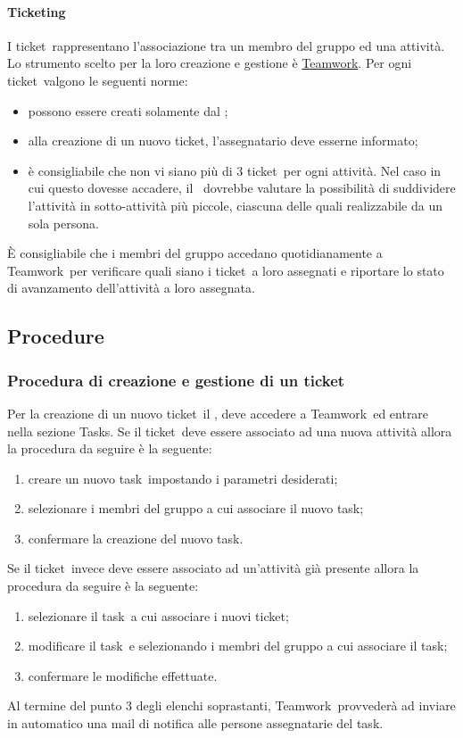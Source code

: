 \documentclass[../NormeProgetto.tex]{subfiles}
\begin{document}
			\paragraph{Ticketing}
			I ticket\g\ rappresentano l'associazione tra un membro del gruppo ed una attività. Lo strumento scelto per la loro creazione e gestione è \hyperref[sec: Pianificazione Teamwork]{Teamwork}. Per ogni ticket\g\ 
valgono le seguenti norme:
			\begin{itemize}
				\item possono essere creati solamente dal \responsabilediprogetto;
				\item alla creazione di un nuovo ticket\g, l'assegnatario deve esserne informato;
				\item è consigliabile che non vi siano più di 3 ticket\g\ per ogni attività. Nel caso in cui questo dovesse accadere, il \responsabilediprogetto\ dovrebbe valutare la possibilità di suddividere l'attività in sotto-attività più piccole, ciascuna delle quali realizzabile da un sola persona.
			\end{itemize}			 
			 È consigliabile che i membri del gruppo accedano quotidianamente a Teamwork\g\ per verificare quali siano i ticket\g\ a loro assegnati e riportare lo stato di avanzamento dell'attività a loro assegnata.
	\subsection{Procedure}
			\subsubsection{Procedura di creazione e gestione di un ticket}				 		Per la creazione di un nuovo ticket\g\ il \responsabilediprogetto, deve accedere a Teamwork\g\ ed entrare nella sezione Tasks. Se il ticket\g\ 
deve essere associato ad una nuova attività allora la procedura da seguire è la seguente:
			\begin{enumerate}
				\item creare un nuovo task\g\ impostando i parametri desiderati;
				\item selezionare i membri del gruppo a cui associare il nuovo task\g;
				\item confermare la creazione del nuovo task\g.
			\end{enumerate}
			Se il ticket\g\ invece deve essere associato ad un'attività già presente allora la procedura da seguire è la seguente:
			\begin{enumerate}
				\item selezionare il task\g\ a cui associare i nuovi ticket\g;
				\item modificare il task\g\ e selezionando i membri del gruppo a cui associare il task\g;
				\item confermare le modifiche effettuate.
			\end{enumerate}
			Al termine del punto 3 degli elenchi soprastanti, Teamwork\g\ provvederà ad inviare in automatico una mail di notifica alle persone assegnatarie del task\g.
			
\end{document}

